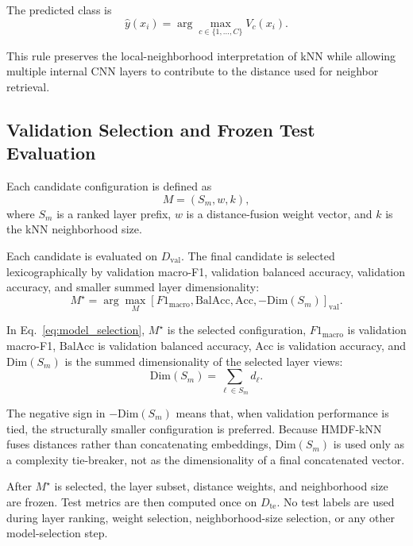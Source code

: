 \documentclass[main.tex]{subfiles}
\begin{document}
The predicted class is
\begin{equation}
  \hat{y}(x_i)
  =
  \arg\max_{c\in\{1,\ldots,C\}}
  V_c(x_i).
  \label{eq:prediction}
\end{equation}

This rule preserves the local-neighborhood interpretation of kNN while allowing multiple internal CNN layers to contribute to the distance used for neighbor retrieval.

\subsection{Validation Selection and Frozen Test Evaluation}

Each candidate configuration is defined as
\begin{equation}
  M = (S_m,w,k),
\end{equation}
where \(S_m\) is a ranked layer prefix, \(w\) is a distance-fusion weight vector, and \(k\) is the kNN neighborhood size.

Each candidate is evaluated on \(D_{\mathrm{val}}\). The final candidate is selected lexicographically by validation macro-F1, validation balanced accuracy, validation accuracy, and smaller summed layer dimensionality:
\begin{equation}
  M^{\star}
  =
  \arg\max_M
  \left[
  F1_{\mathrm{macro}},
  \mathrm{BalAcc},
  \mathrm{Acc},
  -\mathrm{Dim}(S_m)
  \right]_{\mathrm{val}}.
  \label{eq:model_selection}
\end{equation}

In Eq.~\eqref{eq:model_selection}, \(M^{\star}\) is the selected configuration, \(F1_{\mathrm{macro}}\) is validation macro-F1, \(\mathrm{BalAcc}\) is validation balanced accuracy, \(\mathrm{Acc}\) is validation accuracy, and \(\mathrm{Dim}(S_m)\) is the summed dimensionality of the selected layer views:
\begin{equation}
  \mathrm{Dim}(S_m)
  =
  \sum_{\ell\in S_m} d_{\ell}.
\end{equation}

The negative sign in \(-\mathrm{Dim}(S_m)\) means that, when validation performance is tied, the structurally smaller configuration is preferred. Because HMDF-kNN fuses distances rather than concatenating embeddings, \(\mathrm{Dim}(S_m)\) is used only as a complexity tie-breaker, not as the dimensionality of a final concatenated vector.

After \(M^{\star}\) is selected, the layer subset, distance weights, and neighborhood size are frozen. Test metrics are then computed once on \(D_{\mathrm{te}}\). No test labels are used during layer ranking, weight selection, neighborhood-size selection, or any other model-selection step.
\end{document}
